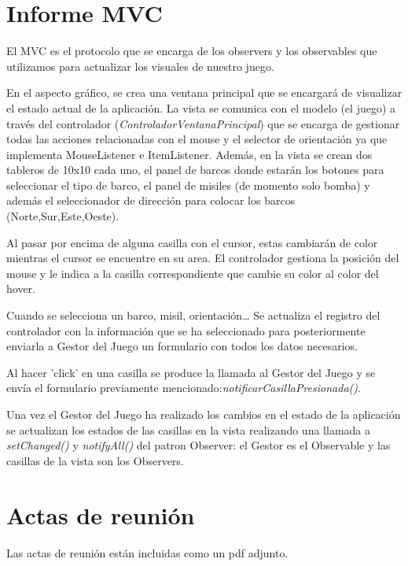\documentclass[12pt, a4paper]{article}
\author{Alan García, Álvaro Díez-Andino, \\Danel Alonso, Gorka Crespo, Adrián López}
\begin{document}
\maketitle
\newpage
\tableofcontents
\newpage

\section{Informe MVC}
El MVC es el protocolo que se encarga de los observers y los observables que utilizamos para actualizar los visuales de nuestro juego.

En el aspecto gráfico, se crea una ventana principal que se encargará de visualizar el estado actual de la aplicación. La vista se comunica con el modelo (el juego) a través del controlador (\textit{ControladorVentanaPrincipal}) que se encarga de gestionar todas las acciones relacionadas con el mouse y el selector de orientación ya que implementa MouseListener e ItemListener. Además, en la vista se crean dos tableros de 10x10 cada uno, el panel de barcos donde estarán los botones para seleccionar el tipo de barco, el panel de misiles (de momento solo bomba) y además el seleccionador de dirección para colocar los barcos (Norte,Sur,Este,Oeste).

Al pasar por encima de alguna casilla con el cursor, estas cambiarán de color mientras el cursor se encuentre en su area. El controlador gestiona la posición del mouse y le indica a la casilla correspondiente que cambie su color al color del hover.

Cuando se selecciona un barco, misil, orientación… Se actualiza el registro del controlador con la información que se ha seleccionado para posteriormente enviarla a Gestor del Juego un formulario con todos los datos necesarios. 

Al hacer 'click' en una casilla se produce la llamada al Gestor del Juego y se envía el formulario previamente mencionado:\textit{notificarCasillaPresionada()}.

Una vez el Gestor del Juego ha realizado los cambios en el estado de la aplicación se actualizan los estados de las casillas en la vista realizando una llamada a \textit{setChanged()} y \textit{notifyAll()} del patron Observer: el Gestor es el Observable y las casillas de la vista son los Observers.

\section{Actas de reunión}
Las actas de reunión están incluidas como un pdf adjunto.


\end{document}
